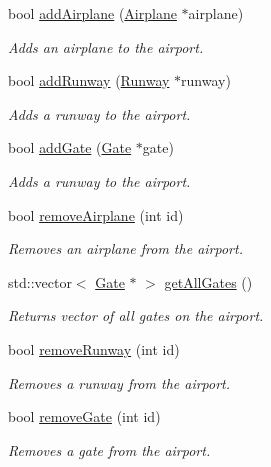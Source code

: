 \begin{DoxyCompactItemize}
bool \mbox{\hyperlink{class_airport_a1862d996ae21c60e86f52a49628a27ff}{add\+Airplane}} (\mbox{\hyperlink{class_airplane}{Airplane}} $\ast$airplane)
\begin{DoxyCompactList}\small\item\em Adds an airplane to the airport. \end{DoxyCompactList}\item 
bool \mbox{\hyperlink{class_airport_a8e8c8a80b3726c1dda7408e90469b9e7}{add\+Runway}} (\mbox{\hyperlink{class_runway}{Runway}} $\ast$runway)
\begin{DoxyCompactList}\small\item\em Adds a runway to the airport. \end{DoxyCompactList}\item 
bool \mbox{\hyperlink{class_airport_a261e0c60f7e788de20ea902cb09b4569}{add\+Gate}} (\mbox{\hyperlink{class_gate}{Gate}} $\ast$gate)
\begin{DoxyCompactList}\small\item\em Adds a runway to the airport. \end{DoxyCompactList}\item 
bool \mbox{\hyperlink{class_airport_a4e4929a17d410aac86d2d518648e4284}{remove\+Airplane}} (int id)
\begin{DoxyCompactList}\small\item\em Removes an airplane from the airport. \end{DoxyCompactList}\item 
std\+::vector$<$ \mbox{\hyperlink{class_gate}{Gate}} $\ast$ $>$ \mbox{\hyperlink{class_airport_aebd46f12a6e13b077f788b8cc73d57fa}{get\+All\+Gates}} ()
\begin{DoxyCompactList}\small\item\em Returns vector of all gates on the airport. \end{DoxyCompactList}\item 
bool \mbox{\hyperlink{class_airport_adb2735f0f7402bdf3946b17b10498b67}{remove\+Runway}} (int id)
\begin{DoxyCompactList}\small\item\em Removes a runway from the airport. \end{DoxyCompactList}\item 
bool \mbox{\hyperlink{class_airport_ad0c61d46c5c811fb9a2d45be1826088c}{remove\+Gate}} (int id)
\begin{DoxyCompactList}\small\item\em Removes a gate from the airport. \end{DoxyCompactList}\item 

\end{DoxyCompactItemize}
